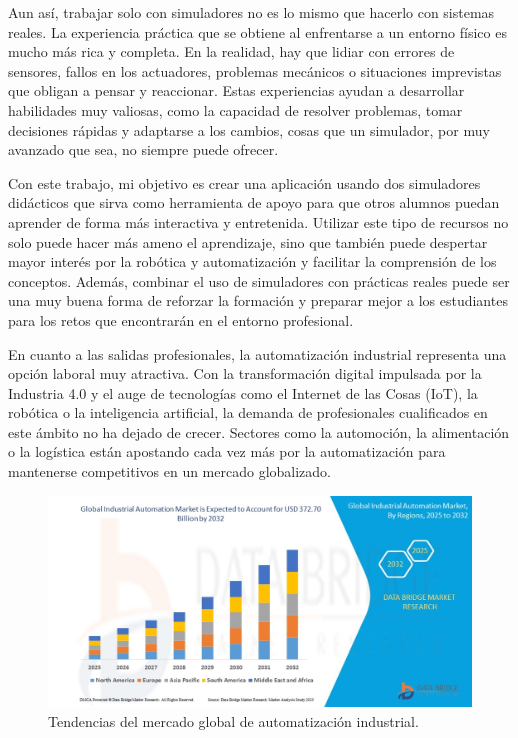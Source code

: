 Aun así, trabajar solo con simuladores no es lo mismo que hacerlo con sistemas reales. La experiencia práctica que se obtiene al enfrentarse a un entorno físico es mucho más rica y completa. En la realidad, hay que lidiar con errores de sensores, fallos en los actuadores, problemas mecánicos o situaciones imprevistas que obligan a pensar y reaccionar. Estas experiencias ayudan a desarrollar habilidades muy valiosas, como la capacidad de resolver problemas, tomar decisiones rápidas y adaptarse a los cambios, cosas que un simulador, por muy avanzado que sea, no siempre puede ofrecer.

Con este trabajo, mi objetivo es crear una aplicación usando dos simuladores didácticos que sirva como herramienta de apoyo para que otros alumnos puedan aprender de forma más interactiva y entretenida. Utilizar este tipo de recursos no solo puede hacer más ameno el aprendizaje, sino que también puede despertar mayor interés por la robótica y automatización y facilitar la comprensión de los conceptos. Además, combinar el uso de simuladores con prácticas reales puede ser una muy buena forma de reforzar la formación y preparar mejor a los estudiantes para los retos que encontrarán en el entorno profesional. 

En cuanto a las salidas profesionales, la automatización industrial representa una opción laboral muy atractiva. Con la transformación digital impulsada por la Industria 4.0 y el auge de tecnologías como el Internet de las Cosas (IoT), la robótica o la inteligencia artificial, la demanda de profesionales cualificados en este ámbito no ha dejado de crecer. Sectores como la automoción, la alimentación o la logística están apostando cada vez más por la automatización para mantenerse competitivos en un mercado globalizado.

\begin{figure} [h!]
  \begin{center}
    \includegraphics[width=14cm]{figs/grafico_futuro}
  \end{center}
  \caption{\centering Tendencias del mercado global de automatización industrial. \cite{grafico_empleabilidad}}
  \label{fig:grafico_futuro}
\end{figure} 

